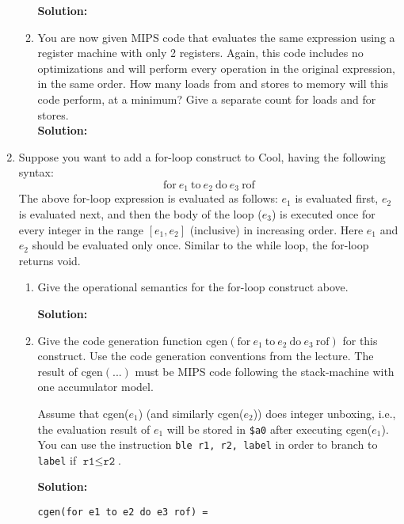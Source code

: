 \documentclass[11pt]{article}
\begin{document}
\begin{enumerate}
\begin{enumerate}
    \textbf{Solution:}
    
    
    \item  You are now given MIPS code that evaluates the same expression using a register machine with only 2 registers. Again, this code includes no optimizations and will perform every operation in the original expression, in the same order. How many loads from and stores to memory will this code perform, at a minimum?  Give a separate count for loads and for stores.
      \\
      
      \textbf{Solution:} 

  \end{enumerate}
\newpage

  \item  Suppose you want to add a for-loop construct to Cool, having the following syntax:
  $$\mbox{for}\  e_1\ \mbox{to}\ e_2\ \mbox{do}\ e_3\ \mbox{rof}$$ 
    The above for-loop expression is evaluated as follows:
    $e_1$ is evaluated first, $e_2$ is evaluated next,
    and then the body of the loop ($e_3$) is executed once for every integer in the range $[e_1,e_2]$ (inclusive) in increasing order.
    Here $e_1$ and $e_2$ should be evaluated only once.
    Similar to the while loop, the for-loop returns void.
  
   \begin{enumerate}
    \item  Give the operational semantics for the for-loop construct above.
    
    \textbf{Solution:}
    
  \item  Give the code generation function $\mbox{cgen}(\mbox{for}\ e_1\ \mbox{to}\ e_2\ \mbox{do}\ e_3\ \mbox{rof})$ for this construct. Use the code generation conventions from the lecture. The result of $\mbox{cgen}(...)$ must be MIPS code following the stack-machine with one accumulator model.
    
    Assume that cgen($e_1$) (and similarly cgen($e_2$)) does integer unboxing, i.e.,
    the evaluation result of $e_1$ will be stored in \texttt{\$a0} after executing cgen($e_1$).
    You can use the instruction {\tt ble r1, r2, label}
    in order to branch to {\tt label} if $\texttt{r1} \leq \texttt{r2}$.
    
      \textbf{Solution:}
    
    \begin{lstlisting}[basicstyle=\ttfamily\footnotesize]
    cgen(for e1 to e2 do e3 rof) =
    \end{lstlisting}
    

\end{enumerate}
\end{enumerate}
\end{document}
